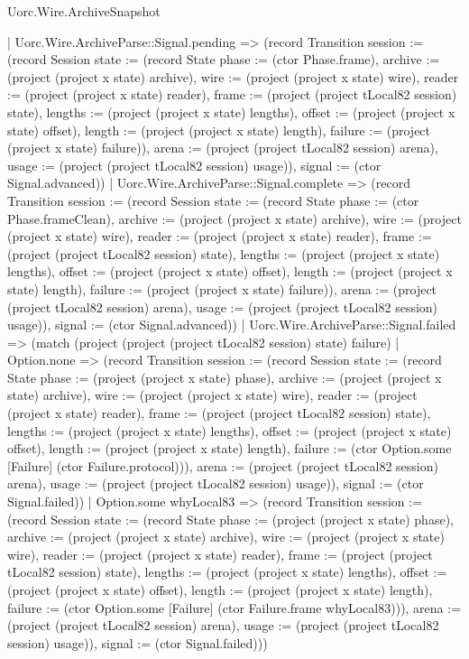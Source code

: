 \begin{lexlean}{Uorc.Wire.ArchiveSnapshot}
\begin{semanticmodule}
{        | Uorc.Wire.ArchiveParse::Signal.pending => (record Transition {session := (record Session {state := (record State {phase := (ctor Phase.frame), archive := (project (project x state) archive), wire := (project (project x state) wire), reader := (project (project x state) reader), frame := (project (project tLocal82 session) state), lengths := (project (project x state) lengths), offset := (project (project x state) offset), length := (project (project x state) length), failure := (project (project x state) failure)}), arena := (project (project tLocal82 session) arena), usage := (project (project tLocal82 session) usage)}), signal := (ctor Signal.advanced)})
        | Uorc.Wire.ArchiveParse::Signal.complete => (record Transition {session := (record Session {state := (record State {phase := (ctor Phase.frameClean), archive := (project (project x state) archive), wire := (project (project x state) wire), reader := (project (project x state) reader), frame := (project (project tLocal82 session) state), lengths := (project (project x state) lengths), offset := (project (project x state) offset), length := (project (project x state) length), failure := (project (project x state) failure)}), arena := (project (project tLocal82 session) arena), usage := (project (project tLocal82 session) usage)}), signal := (ctor Signal.advanced)})
        | Uorc.Wire.ArchiveParse::Signal.failed => (match (project (project (project tLocal82 session) state) failure)
          | Option.none => (record Transition {session := (record Session {state := (record State {phase := (project (project x state) phase), archive := (project (project x state) archive), wire := (project (project x state) wire), reader := (project (project x state) reader), frame := (project (project tLocal82 session) state), lengths := (project (project x state) lengths), offset := (project (project x state) offset), length := (project (project x state) length), failure := (ctor Option.some [Failure] (ctor Failure.protocol))}), arena := (project (project tLocal82 session) arena), usage := (project (project tLocal82 session) usage)}), signal := (ctor Signal.failed)})
          | Option.some whyLocal83 => (record Transition {session := (record Session {state := (record State {phase := (project (project x state) phase), archive := (project (project x state) archive), wire := (project (project x state) wire), reader := (project (project x state) reader), frame := (project (project tLocal82 session) state), lengths := (project (project x state) lengths), offset := (project (project x state) offset), length := (project (project x state) length), failure := (ctor Option.some [Failure] (ctor Failure.frame whyLocal83))}), arena := (project (project tLocal82 session) arena), usage := (project (project tLocal82 session) usage)}), signal := (ctor Signal.failed)}))
}
\end{semanticmodule}
\end{lexlean}
